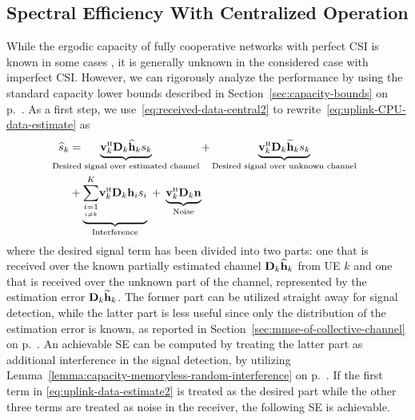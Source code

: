 \subsection{Spectral Efficiency With Centralized Operation}
\label{sec:level4-SE}
While the ergodic capacity of fully cooperative networks with perfect \gls{CSI} is known in some cases \cite{Estella2019a}, it is generally unknown in the considered case with imperfect CSI. However, we can rigorously analyze the performance by using the standard capacity lower bounds described in 
Section~\ref{sec:capacity-bounds} on p.~\pageref{sec:capacity-bounds}.
 As a first step, we use~\eqref{eq:received-data-central2} to rewrite~\eqref{eq:uplink-CPU-data-estimate} as 
\begin{align} \label{eq:uplink-data-estimate2}
\widehat{s}_k& = \hspace{-1cm}\underbrace{\vect{v}_k^{\Htran}\vect{D}_k{\widehat{\vect{h}}}_k s_k}_{\textrm{Desired signal over estimated channel}}+\underbrace{\vect{v}_k^{\Htran}\vect{D}_k{\widetilde{\vect{h}}}_k s_k}_{\textrm{Desired signal over unknown channel}}\nonumber \\ &+\underbrace{\condSum{i=1}{i \neq k}{K}\vect{v}_k^{\Htran}\vect{D}_k\vect{h}_i s_i}_{\textrm{Interference}}\;+\;\underbrace{\vect{v}_k^{\Htran}\vect{D}_k\vect{n}}_{\textrm{Noise}}
\end{align}
where the desired signal term has been divided into two parts: one
that is received over the known partially estimated channel $\mathbf{D}_k{\widehat{\mathbf{h}}}_k$ from UE $k$ and one that is received over the unknown part of the channel, represented by the estimation error $\mathbf{D}_k{\widetilde{\mathbf{h}}}_k$. The former part can be utilized straight away for signal detection, while the latter part is less useful since only the distribution of the estimation error is known, as reported in Section~\ref{sec:mmse-of-collective-channel} on p.~\pageref{sec:mmse-of-collective-channel}. An achievable SE can be computed by treating the latter part as additional interference in the signal detection, by utilizing Lemma~\ref{lemma:capacity-memoryless-random-interference} on p.~\pageref{lemma:capacity-memoryless-random-interference}. If the first term in \eqref{eq:uplink-data-estimate2} is treated as the desired part while the other three terms are treated as noise in the receiver, the following SE is achievable.

